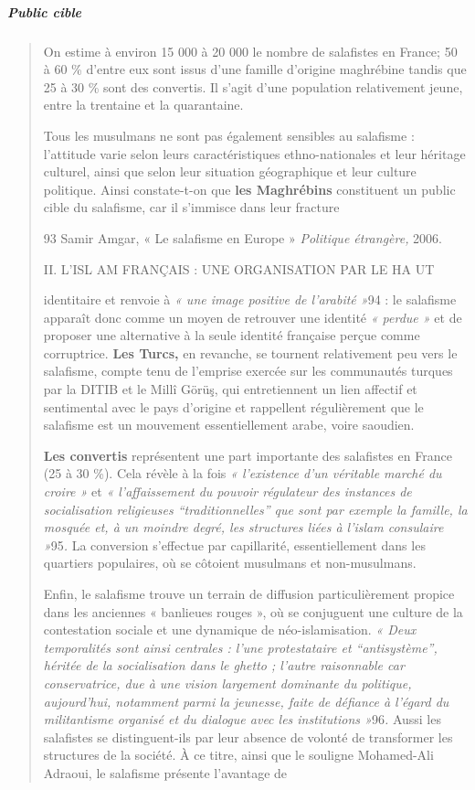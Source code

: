 \hypertarget{public-cible}{%
\subparagraph{Public cible}\label{public-cible}}

\begin{quote}
On estime à environ 15 000 à 20 000 le nombre de salafistes en France;
50 à 60 \% d'entre eux sont issus d'une famille d'origine maghrébine
tandis que 25 à 30 \% sont des convertis. Il s'agit d'une population
relativement jeune, entre la trentaine et la quarantaine.

Tous les musulmans ne sont pas également sensibles au salafisme :
l'attitude varie selon leurs caractéristiques ethno-nationales et leur
héritage culturel, ainsi que selon leur situation géographique et leur
culture politique. Ainsi constate-t-on que \textbf{les Maghrébins}
constituent un public cible du salafisme, car il s'immisce dans leur
fracture

93 Samir Amgar, « Le salafisme en Europe » \emph{Politique étrangère,}
2006.

II. L'ISL AM FRANÇAIS : UNE ORGANISATION PAR LE HA UT

identitaire et renvoie à \emph{« une image positive de l'arabité »}94 :
le salafisme apparaît donc comme un moyen de retrouver une identité
\emph{« perdue »} et de proposer une alternative à la seule identité
française perçue comme corruptrice. \textbf{Les Turcs,} en revanche, se
tournent relativement peu vers le salafisme, compte tenu de l'emprise
exercée sur les communautés turques par la DITIB et le Millî Görüş, qui
entretiennent un lien affectif et sentimental avec le pays d'origine et
rappellent régulièrement que le salafisme est un mouvement
essentiellement arabe, voire saoudien.

\textbf{Les convertis} représentent une part importante des salafistes
en France (25 à 30 \%). Cela révèle à la fois \emph{« l'existence d'un
véritable marché du croire »} et \emph{« l'affaissement du pouvoir
régulateur des instances de socialisation religieuses
``traditionnelles'' que sont par exemple la famille, la mosquée et, à un
moindre degré, les structures liées à l'islam consulaire »}95\emph{.} La
conversion s'effectue par capillarité, essentiellement dans les
quartiers populaires, où se côtoient musulmans et non-musulmans.

Enfin, le salafisme trouve un terrain de diffusion particulièrement
propice dans les anciennes « banlieues rouges », où se conjuguent une
culture de la contestation sociale et une dynamique de néo-islamisation.
\emph{« Deux temporalités sont ainsi centrales : l'une protestataire et
``antisystème'', héritée de la socialisation dans le ghetto ; l'autre
raisonnable car conservatrice, due à une vision largement dominante du
politique, aujourd'hui, notamment parmi la jeunesse, faite de défiance à
l'égard du militantisme organisé et du dialogue avec les institutions
»}96\emph{.} Aussi les salafistes se distinguent-ils par leur absence de
volonté de transformer les structures de la société. À ce titre, ainsi
que le souligne Mohamed-Ali Adraoui, le salafisme présente l'avantage de


\end{quote}
